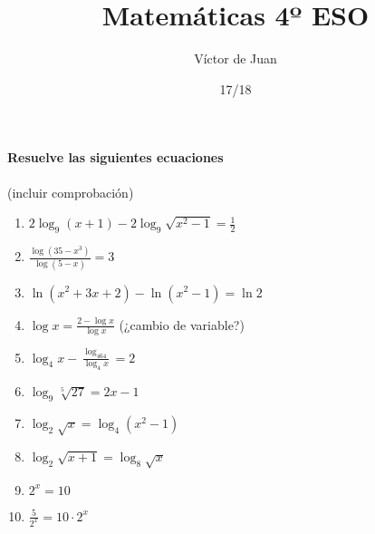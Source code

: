 \documentclass[palatino,nosec,nochap]{Docencia}
\title{Matemáticas 4º ESO}
\author{Víctor de Juan}
\date{17/18}
\begin{document}
\pagestyle{plain}

\paragraph{Resuelve las siguientes ecuaciones} (incluir comprobación)

\begin{enumerate}
	\item $\displaystyle 2\log_9(x+1) - 2\log_9\sqrt{x^2-1} = \frac{1}{2}$
	\vspace{1cm}
	\item $\displaystyle\frac{\log(35-x^3)}{\log(5-x)} = 3$
	\vspace{1cm}
	\item $\displaystyle \ln(x^2+3x+2) - \ln (x^2-1) = \ln 2$
	\vspace{1cm}
	\item $\displaystyle \log x=\frac{2-\log x}{\log x}$ (¿cambio de variable?)
	\vspace{1cm}
	\item $\displaystyle \log_4 x - \frac{\log_464}{\log_4x} = 2$
	\vspace{1cm}
	\item $\displaystyle \log_9\sqrt[5]{27} = 2x-1$
	\vspace{1cm}
	\item $\displaystyle \log_2\sqrt{x} = \log_4{(x^2-1)}$
	\vspace{1cm}
	\item $\displaystyle \log_2\sqrt{x+1} = \log_8\sqrt{x}$
	\vspace{1cm}
	\item $\displaystyle 2^x = 10$
	\vspace{1cm}
	\item $\displaystyle \frac{5}{2^x} = 10·2^x$
\end{enumerate}

\printindex
\end{document}
